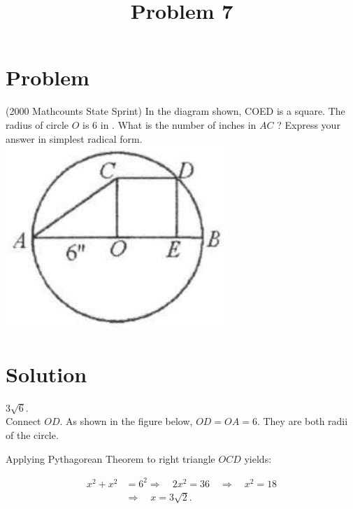 \documentclass{article}
\title{Problem 7}
\date{}
\begin{document}
\maketitle

\section*{Problem}
(2000 Mathcounts State Sprint) In the diagram shown, COED is a square. The radius of circle \(O\) is 6 in . What is the number of inches in \(A C\) ? Express your answer in simplest radical form.\\
\centering
\includegraphics[width=\textwidth]{images/problem_image_1.jpg}

\section*{Solution}
\(3 \sqrt{6}\).\\
Connect \(O D\). As shown in the figure below, \(O D=O A=6\). They are both radii of the circle.

Applying Pythagorean Theorem to right triangle \(O C D\) yields:

\[
\begin{aligned}
x^{2}+x^{2} & =6^{2} \Rightarrow \quad 2 x^{2}=36 \quad \Rightarrow \quad x^{2}=18 \\
& \Rightarrow \quad x=3 \sqrt{2} .
\end{aligned}
\]
\end{document}
